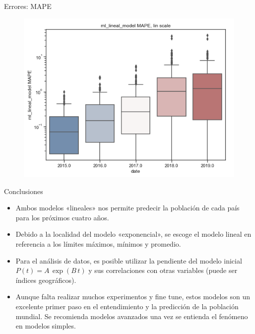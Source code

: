 \documentclass[10pt]{beamer}
\begin{document}
\begin{frame}{Errores: MAPE}
\begin{figure}
\includegraphics[scale=0.25]{img/19.png}
\end{figure}
\end{frame}

\begin{frame}{Conclusiones}
\begin{itemize}
\item \justifying Ambos modelos «lineales» nos permite predecir la población de cada país para los próximos cuatro años.
\item Debido a la localidad del modelo «exponencial», se escoge el modelo lineal en referencia a los límites máximos, mínimos y promedio. 
\item Para el análisis de datos, es posible utilizar la pendiente del modelo inicial $P(t)=A\,\exp(B\,t)$ y sus correlaciones con otras variables (puede ser índices geográficos).
\item Aunque falta realizar muchos experimentos y fine tune, estos modelos son un excelente primer paso en el entendimiento y la predicción de la población mundial. Se recomienda modelos avanzados una vez se entienda el fenómeno en modelos simples. 
\end{itemize}
\end{frame}
\end{document}
